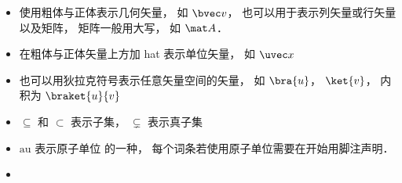 
\begin{itemize}
\item 使用粗体与正体表示几何矢量， 如 $\bvec v$， 也可以用于表示列矢量或行矢量以及矩阵， 矩阵一般用大写， 如 $\mat A$．
\item 在粗体与正体矢量上方加 hat 表示单位矢量， 如 $\uvec x$
\item 也可以用狄拉克符号表示任意矢量空间的矢量， 如 $\bra{u}$， $\ket{v}$， 内积为 $\braket{u}{v}$
\item $\subseteq$ 和 $\subset$ 表示子集， $\subsetneq$ 表示真子集
\item $\mathrm{au}$ 表示原子单位 的一种， 每个词条若使用原子单位需要在开始用脚注声明．
\item 
\end{itemize}
